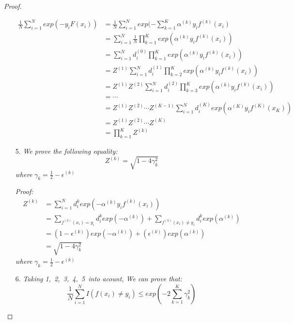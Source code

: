 \documentclass{article} %
\newtheorem{proof}{Proof}
\begin{document}
\begin{proof}
\begin{itemize}
$$
\begin{aligned}
\frac{1}{N}\sum_{i=1}^Nexp(-y_iF(x_i))&=\frac{1}{N}\sum_{i=1}^Nexp(-\sum_{k=1}^K\alpha^{(k)}y_if^{(k)}(x_i)\\
&=\sum_{i=1}^N\frac{1}{N}\prod_{k=1}^Kexp(\alpha^{(k)}y_if^{(k)}(x_i))\\
&=\sum_{i=1}^Nd_i^{(0)}\prod_{k=1}^Kexp(\alpha^{(k)}y_if^{(k)}(x_i))\\
&=Z^{(1)}\sum_{i=1}^Nd_i^{(1)}\prod_{k=2}^Kexp(\alpha^{(k)}y_if^{(k)}(x_i))\\
&=Z^{(1)}Z^{(2)}\sum_{i=1}^Nd_i^{(2)}\prod_{k=3}^Kexp(\alpha^{(k)}y_if^{(k)}(x_i))\\
&=\cdots\\
&=Z^{(1)}Z^{(2)}\cdots Z^{(K-1)}\sum_{i=1}^Nd_i^{(K)}exp(\alpha^{(K)}y_if^{(K)}(x_K))\\
&=Z^{(1)}Z^{(2)}\cdots Z^{(K)}\\
&=\prod_{k=1}^KZ^{(k)}
\end{aligned}
$$

\item[5.] \emph{We prove the following equality:}
$$Z^{(k)}=\sqrt{1-4\gamma_k^2}$$
\emph{where} $\gamma_k=\frac{1}{2}-\epsilon^{(k)}$

\emph{Proof:}
$$
\begin{aligned}
Z^{(k)}&=\sum_{i=1}^Nd_{i}^kexp(-\alpha^{(k)}y_if^{(k)}(x_i))\\
&=\sum_{f^{(k)}(x_i)=y_i}d_{i}^kexp(-\alpha^{(k)})+\sum_{f^{(k)}(x_i)\neq y_i}d_{i}^kexp(\alpha^{(k)})\\
&=(1-\epsilon^{(k)})exp(-\alpha^{(k)})+(\epsilon^{(k)})exp(\alpha^{(k)})\\
&=\sqrt{1-4\gamma_k^2}
\end{aligned}
$$
\emph{where} $\gamma_k=\frac{1}{2}-\epsilon^{(k)}$

\item[6.] \emph{Taking 1,\ 2,\ 3,\ 4,\ 5\ into acount,
We can prove that:}
$$\frac{1}{N}\sum_{i=1}^NI(f(x_i)\neq y_i)\leq exp(-2\sum_{k=1}^K\gamma_k^2)$$

\end{itemize}

\end{proof}
\end{document}
